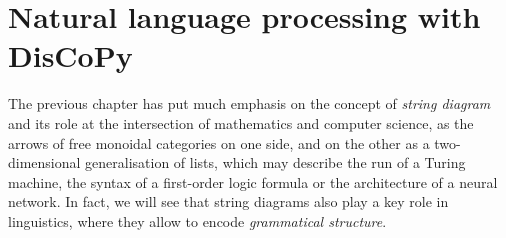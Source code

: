 
\section{Natural language processing with DisCoPy}\label{section:NLP}

The previous chapter has put much emphasis on the concept of \emph{string diagram} and its role at the intersection of mathematics and computer science, as the arrows of free monoidal categories on one side, and on the other as a two-dimensional generalisation of lists, which may describe the run of a Turing machine, the syntax of a first-order logic formula or the architecture of a neural network.
In fact, we will see that string diagrams also play a key role in linguistics, where they allow to encode \emph{grammatical structure}.


%
%
%
%
%
%
%
%
%
